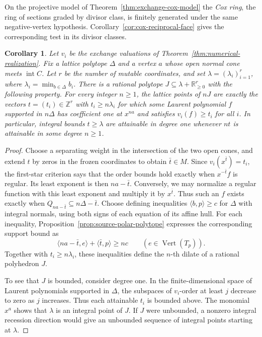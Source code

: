 \documentclass[11pt,reqno]{amsart}
\numberwithin{equation}{section}
\newtheorem{corollary}[theorem]{Corollary}
\theoremstyle{definition}
\theoremstyle{remark}
\begin{document}
On the projective model of Theorem~\ref{thm:exchange-cox-model}
the \emph{Cox ring}, the ring of sections graded by divisor class,
is finitely generated under the same negative-vertex
hypothesis. Corollary~\ref{cor:cox-reciprocal-face} gives the
corresponding test in its divisor classes.

\begin{samepage}
\begin{corollary}\label{cor:simultaneous-exchange-orders}
Let \(v_i\) be the exchange valuations of Theorem~\ref{thm:numerical-realization}.
Fix a lattice polytope \(\Delta\) and a vertex \(a\) whose open normal
cone meets \(\operatorname{int}C\). Let \(r\) be the number of mutable
coordinates, and set \(\lambda=(\lambda_i)_{i=1}^r\), where \(\lambda_i=\min_{b\in\Delta} b_i\).
There is a rational polytope \(J\subseteq\lambda+\mathbb R_{\ge0}^r\)
with the following property. For every integer \(n\ge1\), the lattice
points of \(nJ\) are exactly the vectors \(t=(t_i)\in\mathbb Z^r\)
with \(t_i\ge n\lambda_i\) for which some Laurent polynomial \(f\)
supported in \(n\Delta\) has coefficient one at \(x^{na}\) and
satisfies \(v_i(f)\ge t_i\) for all \(i\). In particular, integral
bounds \(t\ge\lambda\) are attainable in degree one whenever \(nt\)
is attainable in some degree \(n\ge1\).
\end{corollary}
\end{samepage}
\begin{proof}
Choose a separating weight in the intersection of the two open cones,
and extend \(t\) by zeros in the frozen coordinates to obtain \(\bar t\in M\).
Since \(v_i(x^{\bar t})=t_i\), the first-star criterion says that the
order bounds hold exactly when \(x^{-\bar t}f\) is regular. Its least
exponent is then \(na-\bar t\). Conversely, we may normalize a regular
function with this least exponent and multiply it by \(x^{\bar t}\).
Thus such an \(f\) exists exactly when
\(Q_{na-\bar t}\subseteq n\Delta-\bar t\).
Choose defining inequalities \(\langle b,p\rangle\ge c\) for \(\Delta\)
with integral normals, using both signs of each equation of its affine hull.
For each inequality, Proposition~\ref{prop:source-polar-polytope}
expresses the corresponding support bound as
\[ \langle na-\bar t,e\rangle+\langle\bar t,p\rangle\ge nc \qquad(e\in\operatorname{Vert}(T_p)). \]
Together with \(t_i\ge n\lambda_i\), these inequalities define the
\(n\)-th dilate of a rational polyhedron \(J\).

To see that \(J\) is bounded, consider degree one. In the finite-dimensional
space of Laurent polynomials supported in \(\Delta\), the subspaces of
\(v_i\)-order at least \(j\) decrease to zero as \(j\) increases. Thus
each attainable \(t_i\) is bounded above. The monomial \(x^a\) shows
that \(\lambda\) is an integral point of \(J\). If \(J\) were unbounded,
a nonzero integral recession direction would give an unbounded sequence
of integral points starting at \(\lambda\).
\end{proof}
\end{document}
